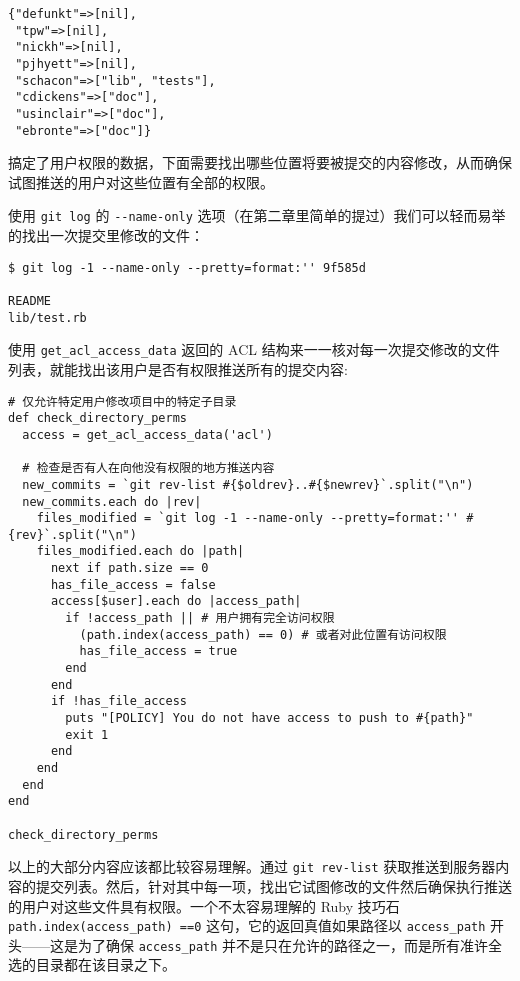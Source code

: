 \documentclass[a4paper]{book}
\begin{document}
\begin{shaded}\begin{verbatim}
{"defunkt"=>[nil],
 "tpw"=>[nil],
 "nickh"=>[nil],
 "pjhyett"=>[nil],
 "schacon"=>["lib", "tests"],
 "cdickens"=>["doc"],
 "usinclair"=>["doc"],
 "ebronte"=>["doc"]}
\end{verbatim}\end{shaded}

搞定了用户权限的数据，下面需要找出哪些位置将要被提交的内容修改，从而确保试图推送的用户对这些位置有全部的权限。

使用 \texttt{git log} 的 \texttt{-{}-name-only} 选项（在第二章里简单的提过）我们可以轻而易举的找出一次提交里修改的文件：

\begin{shaded}\begin{verbatim}
$ git log -1 --name-only --pretty=format:'' 9f585d

README
lib/test.rb
\end{verbatim}\end{shaded}

使用 \texttt{get\_acl\_access\_data} 返回的 ACL 结构来一一核对每一次提交修改的文件列表，就能找出该用户是否有权限推送所有的提交内容:

\begin{shaded}\begin{verbatim}
# 仅允许特定用户修改项目中的特定子目录
def check_directory_perms
  access = get_acl_access_data('acl')

  # 检查是否有人在向他没有权限的地方推送内容
  new_commits = `git rev-list #{$oldrev}..#{$newrev}`.split("\n")
  new_commits.each do |rev|
    files_modified = `git log -1 --name-only --pretty=format:'' #{rev}`.split("\n")
    files_modified.each do |path|
      next if path.size == 0
      has_file_access = false
      access[$user].each do |access_path|
        if !access_path || # 用户拥有完全访问权限
          (path.index(access_path) == 0) # 或者对此位置有访问权限
          has_file_access = true 
        end
      end
      if !has_file_access
        puts "[POLICY] You do not have access to push to #{path}"
        exit 1
      end
    end
  end  
end

check_directory_perms
\end{verbatim}\end{shaded}

以上的大部分内容应该都比较容易理解。通过 \texttt{git rev-list} 获取推送到服务器内容的提交列表。然后，针对其中每一项，找出它试图修改的文件然后确保执行推送的用户对这些文件具有权限。一个不太容易理解的 Ruby 技巧石 \texttt{path.index(access\_path) ==0} 这句，它的返回真值如果路径以 \texttt{access\_path} 开头------这是为了确保 \texttt{access\_path} 并不是只在允许的路径之一，而是所有准许全选的目录都在该目录之下。
\end{document}
